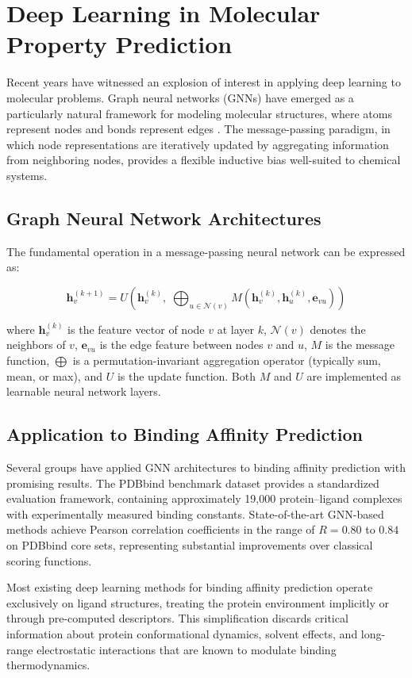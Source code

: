 \section{Deep Learning in Molecular Property Prediction}

Recent years have witnessed an explosion of interest in applying deep learning to molecular problems. Graph neural networks (GNNs) have emerged as a particularly natural framework for modeling molecular structures, where atoms represent nodes and bonds represent edges \cite{Gilmer2017}. The message-passing paradigm, in which node representations are iteratively updated by aggregating information from neighboring nodes, provides a flexible inductive bias well-suited to chemical systems.

\subsection{Graph Neural Network Architectures}

The fundamental operation in a message-passing neural network can be expressed as:

\begin{equation}\label{eq:mpnn}
\mathbf{h}_v^{(k+1)} = U\left(\mathbf{h}_v^{(k)},\; \bigoplus_{u \in \mathcal{N}(v)} M\left(\mathbf{h}_v^{(k)}, \mathbf{h}_u^{(k)}, \mathbf{e}_{vu}\right)\right)
\end{equation}

where $\mathbf{h}_v^{(k)}$ is the feature vector of node $v$ at layer $k$, $\mathcal{N}(v)$ denotes the neighbors of $v$, $\mathbf{e}_{vu}$ is the edge feature between nodes $v$ and $u$, $M$ is the message function, $\bigoplus$ is a permutation-invariant aggregation operator (typically sum, mean, or max), and $U$ is the update function. Both $M$ and $U$ are implemented as learnable neural network layers.

\subsection{Application to Binding Affinity Prediction}

Several groups have applied GNN architectures to binding affinity prediction with promising results. The PDBbind benchmark dataset \cite{Wang2004} provides a standardized evaluation framework, containing approximately 19,000 protein--ligand complexes with experimentally measured binding constants. State-of-the-art GNN-based methods achieve Pearson correlation coefficients in the range of $R = 0.80$ to $0.84$ on PDBbind core sets, representing substantial improvements over classical scoring functions.

\begin{insightbox}
Most existing deep learning methods for binding affinity prediction operate exclusively on ligand structures, treating the protein environment implicitly or through pre-computed descriptors. This simplification discards critical information about protein conformational dynamics, solvent effects, and long-range electrostatic interactions that are known to modulate binding thermodynamics.
\end{insightbox}
